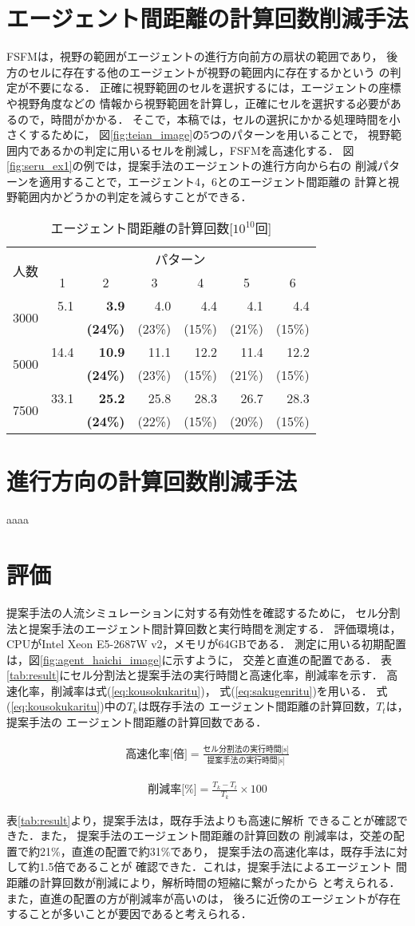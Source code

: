 \documentclass{maelab_y}
\newcommand{\分類条件}{%
\begin{table}[t]
\begin{center}
\caption{進行方向を分類する条件}
\ecaption{Classification condition of moving direction $e_{i}$.}
\label{tb:hantei_jouken}
\begin{tabular}{c|c|c|c|c}
\hline \hline
			& 右 & 左 & 上 & 下 \\ \hline
パターン2   & $\frac{1}{\sqrt{2}} < e_x \leq 1  $
		    & $ -1 \leq e_x < \frac{-1}{\sqrt{2}}$ 
		    & $ \frac{-1}{\sqrt{2}} < e_x < \frac{1}{\sqrt{2}} $ 
		    & $ \frac{-1}{2} < e_x < \frac{1}{2} $ \\
パターン3   & $\frac{-1}{2} < e_y < \frac{1}{2} $ 
		    & $\frac{-1}{2} < e_y < \frac{1}{2} $
            & $ \frac{1}{\sqrt{2}} < e_y \leq 1$
		    & $ -1 \leq e_y < \frac{-1}{\sqrt{2}} $ \\
\hline
\multirow{2}{*}{パターン4}   
			& $R_x \geq A_x$ & $R_x < A_x$ & $R_y \geq A_y$ & $R_y < A_y $ \\
	        &  $L_x \geq A_x$ & $L_x < A_x$ & $L_y \geq A_y$ & $L_y < A_y$ \\
\hline
\multirow{2}{*}{パターン5}   
 			& $R_x \geq x_1$ & $R_x < x_2$ & $R_y \geq y_1$ & $R_y < y_2 $ \\
			& $L_x \geq x_1$ & $L_x < x_2$ & $L_y \geq y_1$ & $L_y < y_2 $ \\
\hline
パターン6   & $ \cos(\frac{1}{2}\theta_{view}) \leq  e_y $ 
			& $ e_y \leq -\cos(\frac{1}{2}\theta_{view})$ 
			& $ \sin(\frac{1}{2}(\pi - \theta_{view})) \leq e_x $ 
			& $ e_x \leq \sin(\frac{1}{2}(\pi - \theta_{view}))  $ \\
\hline
\end{tabular}
\end{center}
\end{table}}%
\newcommand{\距離計算new}{%
  \begin{table}[]
    \caption{エージェント間距離の計算回数[$10^{10}$回]}
    \label{tab:my-table}
    \begin{tabular}{c|llllll}
    \hline \hline
    \multirow{2}{*}{人数}   & \multicolumn{6}{c}{パターン}                                                                                                                                                              \\ \cline{2-7} 
                          & \multicolumn{1}{c|}{1}    & \multicolumn{1}{c|}{2}               & \multicolumn{1}{c|}{3}      & \multicolumn{1}{c|}{4}      & \multicolumn{1}{c|}{5}      & \multicolumn{1}{c}{6}    \\ \hline
    \multirow{2}{*}{3000} & \multicolumn{1}{r|}{5.1}  & \multicolumn{1}{r|}{\textbf{3.9}}    & \multicolumn{1}{r|}{4.0}    & \multicolumn{1}{r|}{4.4}    & \multicolumn{1}{r|}{4.1}    & \multicolumn{1}{r}{4.4}  \\
                          & \multicolumn{1}{l|}{}     & \multicolumn{1}{l|}{\textbf{(24\%)}} & \multicolumn{1}{l|}{(23\%)} & \multicolumn{1}{l|}{(15\%)} & \multicolumn{1}{l|}{(21\%)} & (15\%)                   \\ \hline
    \multirow{2}{*}{5000} & \multicolumn{1}{r|}{14.4} & \multicolumn{1}{r|}{\textbf{10.9}}   & \multicolumn{1}{r|}{11.1}   & \multicolumn{1}{r|}{12.2}   & \multicolumn{1}{r|}{11.4}   & \multicolumn{1}{r}{12.2} \\
                          & \multicolumn{1}{l|}{}     & \multicolumn{1}{l|}{\textbf{(24\%)}} & \multicolumn{1}{l|}{(23\%)} & \multicolumn{1}{l|}{(15\%)} & \multicolumn{1}{l|}{(21\%)} & (15\%)                   \\ \hline
    \multirow{2}{*}{7500} & \multicolumn{1}{r|}{33.1} & \multicolumn{1}{r|}{\textbf{25.2}}   & \multicolumn{1}{r|}{25.8}   & \multicolumn{1}{r|}{28.3}   & \multicolumn{1}{r|}{26.7}   & \multicolumn{1}{r}{28.3} \\
                          & \multicolumn{1}{l|}{}     & \multicolumn{1}{l|}{\textbf{(24\%)}} & \multicolumn{1}{l|}{(22\%)} & \multicolumn{1}{l|}{(15\%)} & \multicolumn{1}{l|}{(20\%)} & (15\%)                   \\ \hline
    \end{tabular}
    \end{table}
}%
\begin{document}
\section{エージェント間距離の計算回数削減手法}
FSFMは，視野の範囲がエージェントの進行方向前方の扇状の範囲であり，
後方のセルに存在する他のエージェントが視野の範囲内に存在するかという
の判定が不要になる．
正確に視野範囲のセルを選択するには，エージェントの座標や視野角度などの
情報から視野範囲を計算し，正確にセルを選択する必要があるので，時間がかかる．
そこで，本稿では，セルの選択にかかる処理時間を小さくするために，
図\ref{fig:teian_image}の5つのパターンを用いることで，
視野範囲内であるかの判定に用いるセルを削減し，FSFMを高速化する．
図\ref{fig:seru_ex1}の例では，提案手法のエージェントの進行方向から右の
削減パターンを適用することで，エージェント4，6とのエージェント間距離の
計算と視野範囲内かどうかの判定を減らすことができる．



\距離計算new

\section{進行方向の計算回数削減手法}
aaaa

\section{評価}
提案手法の人流シミュレーションに対する有効性を確認するために，
セル分割法と提案手法のエージェント間計算回数と実行時間を測定する．
評価環境は，CPUがIntel Xeon E5-2687W v2，メモリが64GBである．
測定に用いる初期配置は，図\ref{fig:agent_haichi_image}に示すように，
交差と直進の配置である．
表\ref{tab:result}にセル分割法と提案手法の実行時間と高速化率，削減率を示す．
高速化率，削減率は式(\ref{eq:kousokukaritu})，
式(\ref{eq:sakugenritu})を用いる．
式(\ref{eq:kousokukaritu})中の$T_{k}$は既存手法の
エージェント間距離の計算回数，$T_{t}$は，提案手法の
エージェント間距離の計算回数である．

\begin{eqnarray}
  \label{eq:kousokukaritu}
  \mbox{高速化率[倍]} =
  \frac{\mbox{セル分割法の実行時間[s]}}{\mbox{提案手法の実行時間[s]}}
\end{eqnarray}

\begin{eqnarray}
  \label{eq:sakugenritu}
  \mbox{削減率[\%]} =
  \frac{T_{k} - T_{t}}{T_{k}} \times 100
\end{eqnarray}

表\ref{tab:result}より，提案手法は，既存手法よりも高速に解析
できることが確認できた．また，
提案手法のエージェント間距離の計算回数の
削減率は，交差の配置で約21\%，直進の配置で約31\%であり，
提案手法の高速化率は，既存手法に対して約1.5倍であることが
確認できた．これは，提案手法によるエージェント
間距離の計算回数が削減により，解析時間の短縮に繋がったから
と考えられる．また，直進の配置の方が削減率が高いのは，
後ろに近傍のエージェントが存在することが多いことが要因であると考えられる．
\end{document}
